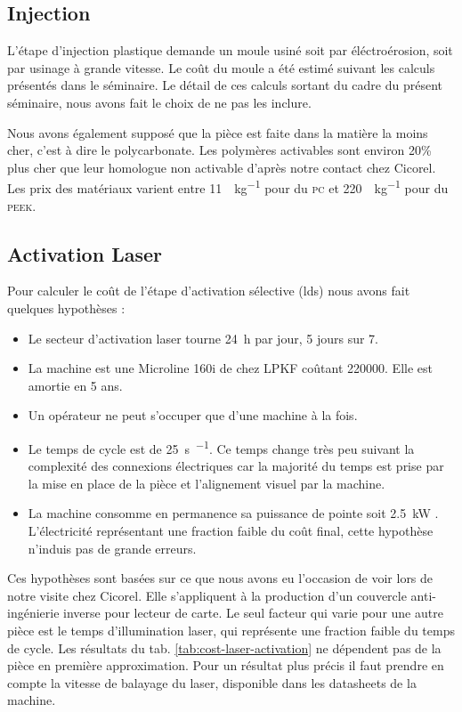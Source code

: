 \subsection{Injection}

L'étape d'injection plastique demande un moule usiné soit par éléctroérosion, soit par usinage à grande vitesse.
Le coût du moule a été estimé suivant les calculs présentés dans le séminaire\cite{electroerosion-2013}.
Le détail de ces calculs sortant du cadre du présent séminaire, nous avons fait le choix de ne pas les inclure. 

Nous avons également supposé que la pièce est faite dans la matière la moins cher, c'est à dire le polycarbonate.
Les polymères activables sont environ 20\% plus cher que leur homologue non activable d'après notre contact chez Cicorel.
Les prix des matériaux varient entre \SI{11}{\chf\per\kilogram} pour du \textsc{pc} et \SI{220}{\chf\per\kilogram} pour du \textsc{peek}.

\subsection{Activation Laser}
Pour calculer le coût de l'étape d'activation sélective (\gls{lds}) nous avons fait quelques hypothèses :
\begin{itemize}
    \item Le secteur d'activation laser tourne \SI{24}{\hour} par jour, 5 jours sur 7.
    \item La machine est une Microline 160i de chez LPKF coûtant \SI{220000}{\chf}.
        Elle est amortie en 5 ans.
    \item Un opérateur ne peut s'occuper que d'une machine à la fois.
    \item Le temps de cycle est de \SI{25}{\second\per\piece}.
        Ce temps change très peu suivant la complexité des connexions électriques car la majorité du temps est prise par la mise en place de la pièce et l'alignement visuel par la machine.
    \item La machine consomme en permanence sa puissance de pointe soit \SI{2.5}{\kilo\watt} \cite{lpkf-microline-series}.
        L'électricité représentant une fraction faible du coût final, cette hypothèse n'induis pas de grande erreurs.
\end{itemize}

Ces hypothèses sont basées sur ce que nous avons eu l'occasion de voir lors de notre visite chez Cicorel.
Elle s'appliquent à la production d'un couvercle anti-ingénierie inverse pour lecteur de carte.
Le seul facteur qui varie pour une autre pièce est le temps d'illumination laser, qui représente une fraction faible du temps de cycle.
Les résultats du tab. \ref{tab:cost-laser-activation} ne dépendent pas de la pièce en première approximation.
Pour un résultat plus précis il faut prendre en compte la vitesse de balayage du laser, disponible dans les datasheets de la machine.


